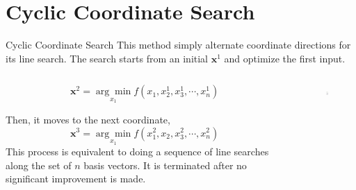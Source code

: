 \documentclass{beamer}
\begin{document}
\section{Cyclic Coordinate Search}
\begin{frame}{Cyclic Coordinate Search}
This method simply alternate coordinate directions for its line search. The search starts from an initial $\boldsymbol{x}^1$ and optimize the first input.
\begin{columns}

\begin{column}{.6\textwidth}
\begin{equation*}
    \boldsymbol{x}^2 = \underset{x_1}{\arg \min} f(x_1, x_2^1, x_3^1, \cdots, x_n^1) 
\end{equation*}

Then, it moves to the next coordinate,
\begin{equation*}
    \boldsymbol{x}^3 = \underset{x_1}{\arg \min} f(x_1^2, x_2, x_3^2, \cdots, x_n^2) 
\end{equation*}
This process is equivalent to doing a sequence of line searches along the set of $n$ basis vectors.
It is terminated after no significant improvement is made.
\end{column}
\pause
\begin{column}{.4\textwidth}
\begin{figure}
\centering
\includegraphics[width=30mm]{Figs/coordinate.jpeg}
\end{figure} 
\end{column}
\end{columns}

\end{frame}
\end{document}
